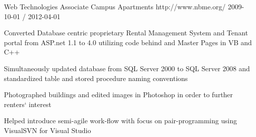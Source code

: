 \begin{cventries}
  \cventry
    {Web Technologies Associate}
    {Campus Apartments}
    {http://www.nbme.org/}
    {2009-10-01 / 2012-04-01}
    {
          \begin{cvitems}
                \item{Converted Database centric proprietary Rental Management System and Tenant portal from ASP.net 1.1 to 4.0 utilizing code behind and Master Pages in VB and C++}
                \item{Simultaneously updated database from SQL Server 2000 to SQL Server 2008 and standardized table and stored procedure naming conventions}
                \item{Photographed buildings and edited images in Photoshop in order to further renters` interest}
                \item{Helped introduce semi-agile work-flow with focus on pair-programming using VisualSVN for Visual Studio}
          \end{cvitems}
    }
 
\end{cventries}
